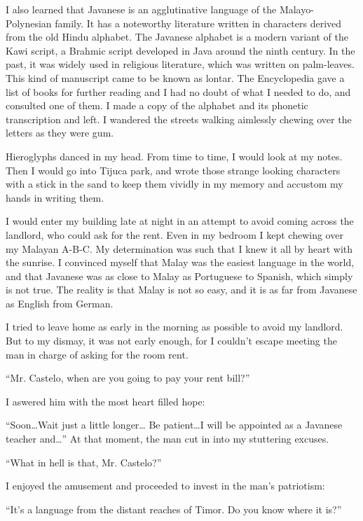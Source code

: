 \documentclass[a4paper,12pt]{book}
\begin{document}
I also learned that Javanese is an agglutinative
language of the Malayo-Polynesian family.
It has a noteworthy literature written in
characters derived from the old Hindu alphabet.
The Javanese alphabet is a modern variant
of the Kawi script, a Brahmic script developed
in Java around the ninth century.
In the past, it was widely used in religious literature,
which was written on palm-leaves.
This kind of manuscript came to be known
as  lontar.
The Encyclopedia gave a list of books for further
reading and I had no doubt of what I needed
to do, and consulted one of them.
I made a copy of the alphabet and its phonetic
transcription and left. I wandered the streets
walking aimlessly chewing over the letters as
they were gum.

Hieroglyphs danced in my head. From time to time,
I would look at my notes. Then I would
go into Tijuca park, and wrote
those strange looking characters
with a stick in the sand to keep
them vividly in my memory
and accustom my hands in writing them.

I would enter my building late at night in
an attempt to avoid coming across the
landlord, who could ask for the rent.
Even in my bedroom I kept chewing over
my Malayan A-B-C. My determination was such
that I knew it all by heart with the sunrise.
I convinced myself that Malay was the
easiest language in the world, and that Javanese
was as close to Malay as Portuguese to
Spanish, which simply is not true.
The reality is that Malay is not so
easy, and it is  as
far from Javanese as English from German.

I tried to leave home as early in the morning
as possible to avoid my landlord.
But to my dismay, it was not early enough,
for I couldn't escape meeting the man
in charge of asking for the room rent.

``Mr. Castelo, when are you going to
pay your rent bill?''

I aswered him with the most heart filled hope:

``Soon\ldots Wait just a little longer\ldots
Be patient\ldots I will be appointed as a
Javanese teacher and\ldots''
At that moment, the man cut in into my stuttering
excuses.

``What in hell is that, Mr. Castelo?''

I enjoyed the amusement
and proceeded to invest
in the man's patriotism:

``It's a language from the distant reaches of Timor.
Do you know where it is?''
\end{document}
